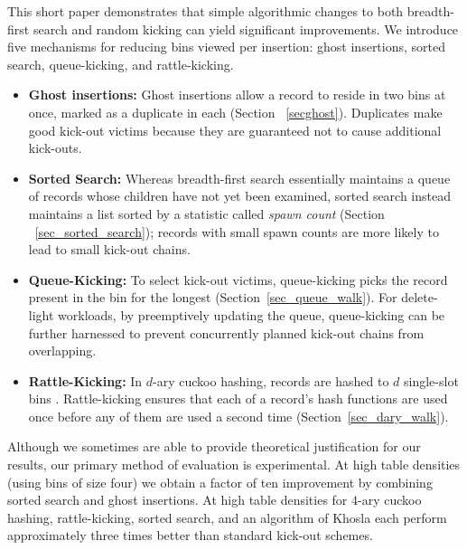 \documentclass{sig-alternate-05-2015}
\begin{document}
This short paper demonstrates that simple algorithmic changes to both
breadth-first search and random kicking can yield significant
improvements. We introduce five mechanisms for reducing bins viewed
per insertion: ghost insertions, sorted search, queue-kicking, and
rattle-kicking.

\begin{itemize}
\item \textbf{Ghost insertions: }Ghost insertions allow a record to
  reside in two bins at once, marked as a duplicate in each (Section
 ~\ref{secghost}). Duplicates make good kick-out victims because they
  are guaranteed not to cause additional kick-outs.

\item \textbf{Sorted Search: }Whereas breadth-first search essentially
  maintains a queue of records whose children have not yet been
  examined, sorted search instead maintains a list sorted by a
  statistic called \emph{spawn count} (Section
 ~\ref{sec_sorted_search}); records with small spawn counts are more
  likely to lead to small kick-out chains.

\item \textbf{Queue-Kicking:} To select kick-out victims,
  queue-kicking picks the record present in the bin for the longest
  (Section~\ref{sec_queue_walk}). For delete-light workloads, by
  preemptively updating the queue, queue-kicking can be further
  harnessed to prevent concurrently planned kick-out chains from
  overlapping.

\item \textbf{Rattle-Kicking: }In $d$-ary cuckoo hashing, records are
  hashed to $d$ single-slot bins \cite{dary}. Rattle-kicking ensures
  that each of a record's hash functions are used once before any of them
  are used a second time (Section~\ref{sec_dary_walk}).
\end{itemize}

Although we sometimes are able to provide theoretical justification
for our results, our primary method of evaluation is experimental. At
high table densities (using bins of size four) we obtain a factor of
ten improvement by combining sorted search and ghost insertions. At
high table densities for $4$-ary cuckoo hashing, rattle-kicking,
sorted search, and an algorithm of Khosla \cite{khosla13} each perform
approximately three times better than standard kick-out schemes.
\end{document}
